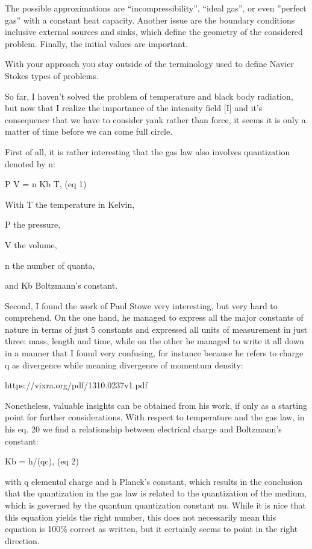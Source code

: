 \documentclass{article}
\begin{document}
{\textquotedbl}The possible approximations are ``incompressibility'', ``ideal gas'', or even ''perfect gas'' with a
constant heat capacity. Another issue are the boundary conditions inclusive external sources and sinks, which define
the geometry of the considered problem. Finally, the initial values are important.

With your approach you stay outside of the terminology used to define Navier Stokes types of problems.{\textquotedbl}

So far, I haven't solved the problem of temperature and black body radiation, but now that I realize the importance of
the intensity field [I] and it's consequence that we have to consider yank rather than force, it seems it is only a
matter of time before we can come full circle.

First of all, it is rather interesting that the gas law also involves quantization denoted by n:

P V = n Kb T, (eq 1)

With T the temperature in Kelvin,

P the pressure,

V the volume,

n the number of quanta,

and Kb Boltzmann's constant.

Second, I found the work of Paul Stowe very interesting, but very hard to comprehend. On the one hand, he managed to
express all the major constants of nature in terms of just 5 constants and expressed all units of measurement in just
three: mass, length and time, while on the other he managed to write it all down in a manner that I found very
confusing, for instance because he refers to charge q as {\textquotedbl}divergence{\textquotedbl} while meaning
{\textquotedbl}divergence of momentum density{\textquotedbl}:

https://vixra.org/pdf/1310.0237v1.pdf 

Nonetheless, valuable insights can be obtained from his work, if only as a starting point for further considerations.
With respect to temperature and the gas law, in his eq. 20 we find a relationship between electrical charge and
Boltzmann's constant: 

Kb = h/(qc), (eq 2)

with q elemental charge and h Planck's constant, which results in the conclusion that the quantization in the gas law is
related to the quantization of the medium, which is governed by the quantum quantization constant nu. While it is nice
that this equation yields the right number, this does not necessarily mean this equation is 100\% correct as written,
but it certainly seems to point in the right direction. 
\end{document}
